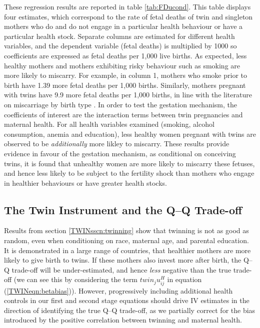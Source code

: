 \documentclass[subeqn]{article}
\begin{document}
\begin{spacing}{1.4}
These regression results are reported in table \ref{tab:FDucond}.  This table
displays four estimates, which correspond to the rate of fetal deaths of twin
and singleton mothers who do and do not engage in a particular health behaviour
or have a particular health stock.  Separate columns are estimated for different
health variables, and the dependent variable (fetal deaths) is multiplied by 1000
so coefficients are expressed as fetal deaths per 1,000 live births. As expected,
less healthy mothers and mothers exhibiting risky behaviour such as smoking are
more likely to miscarry.  For example, in column 1, mothers who smoke prior to
birth have 1.39 more fetal deaths per 1,000 births.  Similarly, mothers pregnant
with twins have 9.9 more fetal deaths per 1,000 births, in line with the
literature on miscarriage by birth type \citep{Garciaetal2002}.  In order to
test the gestation mechanism, the coefficients of interest are the interaction
terms between twin pregnancies and maternal health.  For all health variables 
examined (smoking, alcohol consumption, anemia and education), less healthy women
pregnant with twins are observed to be \emph{additionally} more likley to
miscarry. These results provide evidence in favour of the gestation mechanism,
as conditional on conceiving twins, it is found that unhealthy women are more 
likely to miscarry these fetuses, and hence less likely to be subject to the
fertility shock than mothers who engage in healthier behaviours or have greater
health stocks.

\subsection{The Twin Instrument and the Q--Q Trade-off} \label{TWINsscn:QQtwins}
Results from section \ref{TWINsscn:twinning} show that twinning is not as good
as random, even when conditioning on race, maternal age, and parental education. 
It is demonstrated in a large range of countries, that healthier mothers are 
more likely to give birth to twins. If these mothers also invest more after 
birth, the Q--Q trade-off will be under-estimated, and hence \emph{less} 
negative than the true trade-off (we can see this by considering the term 
$twin_ju^H_{ij}$ in equation (\ref{TWINeqn:betabias})). However, progressively 
including additional health controls in our first and second stage equations 
should drive IV estimates in the direction of identifying the true Q--Q 
trade-off, as we partially correct for the bias introduced by the positive 
correlation between twinning and maternal health.


\end{spacing}
\end{document}
